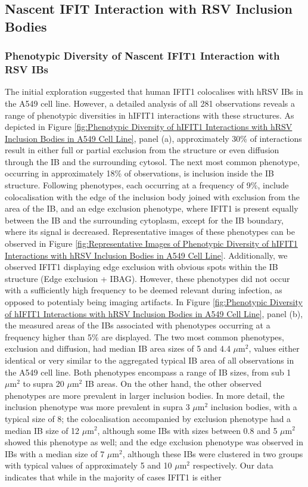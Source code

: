 \subsection{Nascent IFIT Interaction with RSV Inclusion Bodies} \label{subsec:Nascent IFIT Interaction with RSV Inclusion Bodies}
\subsubsection{Phenotypic Diversity of Nascent IFIT1 Interaction with RSV IBs}
The initial exploration suggested that human IFIT1 colocalises with hRSV IBs in the A549 cell line. However, a detailed analysis of all 281 observations reveals a range of phenotypic diversities in hIFIT1 interactions with these structures. As depicted in Figure \ref{fig:Phenotypic Diversity of hIFIT1 Interactions with hRSV Inclusion Bodies in A549 Cell Line}, panel (a), approximately 30\% of interactions result in either full or partial exclusion from the structure or even diffusion through the IB and the surrounding cytosol. The next most common phenotype, occurring in approximately 18\% of observations, is inclusion inside the IB structure. Following phenotypes, each occurring at a frequency of 9\%, include colocalisation with the edge of the inclusion body joined with exclusion from the area of the IB, and an edge exclusion phenotype, where IFIT1 is present equally between the IB and the surrounding cytoplasm, except for the IB boundary, where its signal is decreased. Representative images of these phenotypes can be observed in Figure \ref{fig:Representative Images of Phenotypic Diversity of hIFIT1 Interactions with hRSV Inclusion Bodies in A549 Cell Line}. Additionally, we observed IFIT1 displaying edge exclusion with obvious spots within the IB structure (Edge exclusion + IBAG). However, these phenotypes did not occur with a sufficiently high frequency to be deemed relevant during infection, as opposed to potentialy being imaging artifacts. In Figure \ref{fig:Phenotypic Diversity of hIFIT1 Interactions with hRSV Inclusion Bodies in A549 Cell Line}, panel (b), the measured areas of the IBs associated with phenotypes occurring at a frequency higher than 5\% are displayed. The two most common phenotypes, exclusion and diffusion, had median IB area sizes of 5 and 4.4 \(\mu \mbox{m}^2\), values either identical or very similar to the aggregated typical IB area of all observations in the A549 cell line. Both phenotypes encompass a range of IB sizes, from sub 1 \(\mu \mbox{m}^2\) to supra 20 \(\mu \mbox{m}^2\) IB areas. On the other hand, the other observed phenotypes are more prevalent in larger inclusion bodies. In more detail, the inclusion phenotype was more prevalent in supra 3 \(\mu \mbox{m}^2\) inclusion bodies, with a typical size of 8; the colocalisation accompanied by exclusion phenotype had a median IB size of 12 \(\mu \mbox{m}^2\), although some IBs with sizes between 0.8 and 5 \(\mu \mbox{m}^2\) showed this phenotype as well; and the edge exclusion phenotype was observed in IBs with a median size of 7 \(\mu \mbox{m}^2\), although these IBs were clustered in two groups with typical values of approximately 5 and 10 \(\mu \mbox{m}^2\) respectively. Our data indicates that while in the majority of cases IFIT1 is either 